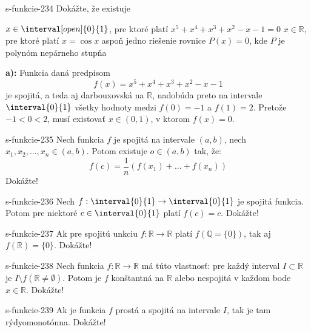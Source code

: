 \begin{defproblem}{s-funkcie-234}
Dokážte, že existuje
\begin{tasks}
\task $x \in \interval[open]{0}{1}$, pre ktoré platí $x^5+x^4+x^3+x^2-x-1=0$
\task $x \in \mathbb{R}$, pre ktoré platí $x=\cos x$
\task aspoň jedno riešenie rovnice $P(x)=0$, kde $P$ je polynóm nepárneho stupňa
\end{tasks}

\begin{solution}
  \textbf{a):}
  Funkcia daná predpisom
  \[
    f(x)=x^5+x^4+x^3+x^2-x-1
  \]
  je spojitá, a teda aj darbouxovská na $\mathbb{R}$, nadobúda preto na
  intervale $\interval{0}{1}$ všetky hodnoty medzi $f(0)=-1$ a $f(1)=2$. Pretože
  $-1<0<2$, musí existovať $x \in (0,1)$, v ktorom $f(x)=0$.
\end{solution}
\end{defproblem}

\begin{defproblem}{s-funkcie-235}
Nech funkcia $f$ je spojitá na intervale $(a,b)$, nech $x_1,x_2,...,x_n \in
(a,b)$. Potom existuje $o \in (a,b)$ tak, že:
$$f(c)=\frac{1}{n}(f(x_1)+...+f(x_n))$$
Dokážte!
\end{defproblem}

\begin{defproblem}{s-funkcie-236}
Nech $f: \interval{0}{1} \rightarrow \interval{0}{1}$ je spojitá funkcia.
Potom pre niektoré $c \in \interval{0}{1}$ platí $f(c)=c$. Dokážte!
\end{defproblem}

\begin{defproblem}{s-funkcie-237}
Ak pre spojitú unkciu $f: \mathbb{R} \rightarrow \mathbb{R}$ platí
$f(\mathbb{Q}= \{0\})$, tak aj $f(\mathbb{R})=\{0\}$. Dokážte!
\end{defproblem}

\begin{defproblem}{s-funkcie-238}
Nech funkcia $f: \mathbb{R} \rightarrow \mathbb{R}$ má túto vlastnosť: pre každý
interval $I \subset \mathbb{R}$ je $I \setminus f(\mathbb{R} \neq \emptyset)$.
Potom je $f$ konštantná na $\mathbb{R}$ alebo nespojitá v každom bode $x \in
\mathbb{R}$. Dokážte!
\end{defproblem}

\begin{defproblem}{s-funkcie-239}
Ak je funkcia $f$ prostá a spojitá na intervale $I$, tak je tam rýdyomonotónna.
Dokážte!
\end{defproblem}

